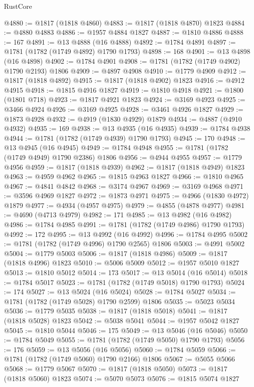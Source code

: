 \begin{lexlean}{RustCore}
\begin{coremodule}
@4880 := @1817 (@1818 @4860)
@4883 := @1817 (@1818 @4870) @1823
@4884 := @4880 @4883
@4886 := @1957 @4884 @1827
@4887 := @1810 @4886
@4888 := 167
@4891 := @13 @4888 (@16 @4888)
@4892 := @1784 @4891
@4897 := @1781 (@1782 (@1749 @4892) @1790 @1793)
@4898 := 168
@4901 := @13 @4898 (@16 @4898)
@4902 := @1784 @4901
@4908 := @1781 (@1782 (@1749 @4902) @1790 @2193) @1806
@4909 := @4897 @4908
@4910 := @1779 @4909
@4912 := @1817 (@1818 @4892)
@4915 := @1817 (@1818 @4902) @1823
@4916 := @4912 @4915
@4918 := @1815 @4916 @1827
@4919 := @1810 @4918
@4921 := @1800 (@1801 @718)
@4923 := @1817 @4921 @1823
@4924 := @3169 @4923
@4925 := @3466 @4924
@4926 := @3169 @4925
@4928 := @3461 @4926 @1827
@4929 := @1873 @4928
@4932 := @4919 (@1830 @4929) @1879
@4934 := @4887 (@4910 @4932)
@4935 := 169
@4938 := @13 @4935 (@16 @4935)
@4939 := @1784 @4938
@4944 := @1781 (@1782 (@1749 @4939) @1790 @1793)
@4945 := 170
@4948 := @13 @4945 (@16 @4945)
@4949 := @1784 @4948
@4955 := @1781 (@1782 (@1749 @4949) @1790 @2386) @1806
@4956 := @4944 @4955
@4957 := @1779 @4956
@4959 := @1817 (@1818 @4939)
@4962 := @1817 (@1818 @4949) @1823
@4963 := @4959 @4962
@4965 := @1815 @4963 @1827
@4966 := @1810 @4965
@4967 := @4841 @4842
@4968 := @3174 @4967
@4969 := @3169 @4968
@4971 := @3596 @4969 @1827
@4972 := @1873 @4971
@4975 := @4966 (@1830 @4972) @1879
@4977 := @4934 (@4957 @4975)
@4979 := @4855 (@4878 @4977)
@4981 := @4690 (@4713 @4979)
@4982 := 171
@4985 := @13 @4982 (@16 @4982)
@4986 := @1784 @4985
@4991 := @1781 (@1782 (@1749 @4986) @1790 @1793)
@4992 := 172
@4995 := @13 @4992 (@16 @4992)
@4996 := @1784 @4995
@5002 := @1781 (@1782 (@1749 @4996) @1790 @2565) @1806
@5003 := @4991 @5002
@5004 := @1779 @5003
@5006 := @1817 (@1818 @4986)
@5009 := @1817 (@1818 @4996) @1823
@5010 := @5006 @5009
@5012 := @1957 @5010 @1827
@5013 := @1810 @5012
@5014 := 173
@5017 := @13 @5014 (@16 @5014)
@5018 := @1784 @5017
@5023 := @1781 (@1782 (@1749 @5018) @1790 @1793)
@5024 := 174
@5027 := @13 @5024 (@16 @5024)
@5028 := @1784 @5027
@5034 := @1781 (@1782 (@1749 @5028) @1790 @2599) @1806
@5035 := @5023 @5034
@5036 := @1779 @5035
@5038 := @1817 (@1818 @5018)
@5041 := @1817 (@1818 @5028) @1823
@5042 := @5038 @5041
@5044 := @1957 @5042 @1827
@5045 := @1810 @5044
@5046 := 175
@5049 := @13 @5046 (@16 @5046)
@5050 := @1784 @5049
@5055 := @1781 (@1782 (@1749 @5050) @1790 @1793)
@5056 := 176
@5059 := @13 @5056 (@16 @5056)
@5060 := @1784 @5059
@5066 := @1781 (@1782 (@1749 @5060) @1790 @2166) @1806
@5067 := @5055 @5066
@5068 := @1779 @5067
@5070 := @1817 (@1818 @5050)
@5073 := @1817 (@1818 @5060) @1823
@5074 := @5070 @5073
@5076 := @1815 @5074 @1827

\end{coremodule}
\end{lexlean}
